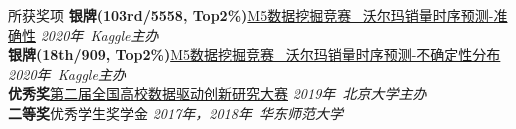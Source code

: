 \documentclass{resume} %
\begin{document}
\begin{rSection}{\noindent 所获奖项}
{\bf 银牌(103rd/5558, Top2\%)}\qquad \href{https://www.kaggle.com/c/m5-forecasting-accuracy}{M5数据挖掘竞赛 \ 沃尔玛销量时序预测-准确性} \hfill{\em 2020年\ Kaggle主办} \\  
{\bf 银牌(18th/909, Top2\%)}\qquad \href{https://www.kaggle.com/c/m5-forecasting-uncertainty}{M5数据挖掘竞赛 \ 沃尔玛销量时序预测-不确定性分布} \hfill{\em 2020年\ Kaggle主办} \\  
{\bf 优秀奖}\qquad \href{http://opendata.pku.edu.cn/competition-2019.xhtml;jsessionid=200f6d0adbfa75292afed361235f}{第二届全国高校数据驱动创新研究大赛} \hfill{\em 2019年\ 北京大学主办}\\ 
{\bf 二等奖}\qquad 优秀学生奖学金    \hfill{\em 2017年，2018年\ 华东师范大学}
\end{rSection}
\end{document}
